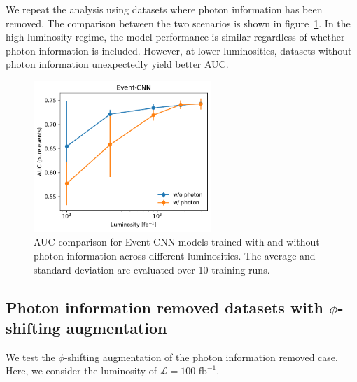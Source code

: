 \documentclass[12pt]{article}
\begin{document}
        We repeat the analysis using datasets where photon information has been removed. The comparison between the two scenarios is shown in figure~\ref{fig:eventCNN_AUC_various_L}. In the high-luminosity regime, the model performance is similar regardless of whether photon information is included. However, at lower luminosities, datasets without photon information unexpectedly yield better AUC.
        \begin{figure}[htpb]
            \centering
            \includegraphics[width=0.60\textwidth]{event_CNN_AUC-true_L.pdf}
            \caption{AUC comparison for Event-CNN models trained with and without photon information across different luminosities. The average and standard deviation are evaluated over 10 training runs.}
            \label{fig:eventCNN_AUC_various_L}
        \end{figure}
    \subsection{Photon information removed datasets with \texorpdfstring{$\phi$}{phi}-shifting augmentation}%
    \label{sub:photon_information_removed_datasets_with_phi_shifting_augmentation}
        We test the $\phi$-shifting augmentation of the photon information removed case. Here, we consider the luminosity of $\mathcal{L} = \text{100 fb}^{-1}$.
        
\end{document}
